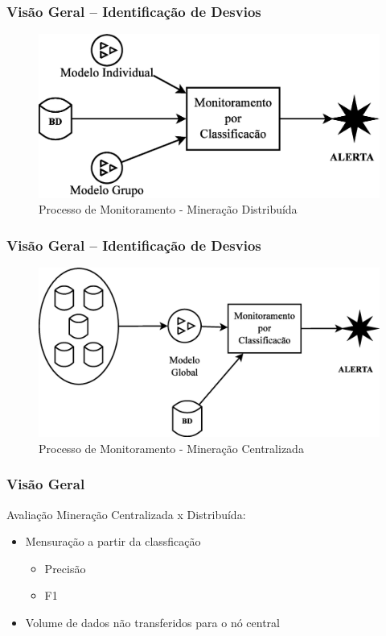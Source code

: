\documentclass[hyperref={pdfpagelabels=false}]{beamer}
\begin{document}
\begin{frame}
	\frametitle{Visão Geral -- Identificação de Desvios}
    \begin{figure}
		\centering
	    \includegraphics[scale=0.30]{img/VisaoGeral-05}
  		\caption{\scriptsize{Processo de Monitoramento - Mineração Distribuída}}
   	\end{figure}
\end{frame}

\begin{frame}
	\frametitle{Visão Geral -- Identificação de Desvios}
    \begin{figure}
		\centering
	    \includegraphics[scale=0.30]{img/VisaoGeral-06}
  		\caption{\scriptsize{Processo de Monitoramento - Mineração Centralizada}}
   	\end{figure}
\end{frame}


\begin{frame}
	\frametitle{Visão Geral}
    Avaliação Mineração Centralizada x Distribuída: \begin{itemize}
	    \item Mensuração a partir da classficação \begin{itemize}
	  	  \item Precisão
          \item F1
	    \end{itemize} 
        \item Volume de dados não transferidos para o nó central
	\end{itemize}
    
\end{frame}
       
\end{document}
